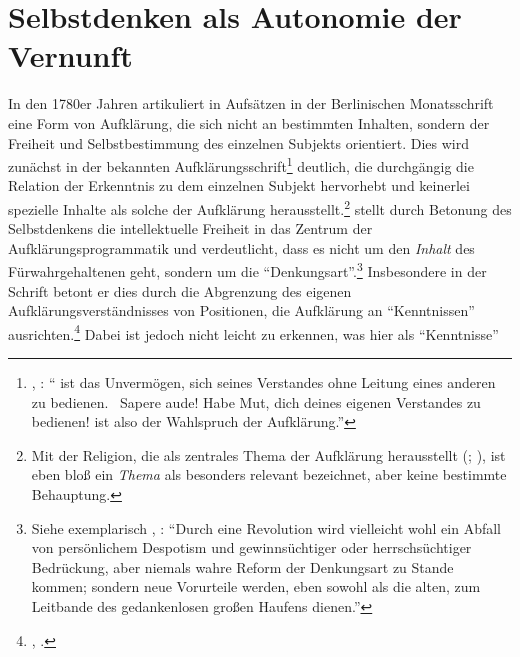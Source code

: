 \section{Selbstdenken als Autonomie der
Vernunft}\label{subsection:SelbstdenkenbeiKant}
In den 1780er Jahren artikuliert  in Aufsätzen in der
Berlinischen Monatsschrift eine Form von Aufklärung, die sich nicht an
bestimmten Inhalten, sondern der Freiheit und Selbstbestimmung des einzelnen
Subjekts orientiert. Dies wird zunächst in der bekannten
Aufklärungsschrift\footnote{\cite[Vgl.][A~481]{Kant:BeantwortungderFrage:WasistAufklaerung?1977},
\cite[][VIII: 35.1--8]{Kant:GesammelteWerke1900ff.}:
\enquote{ ist das Unvermögen, sich seines
Verstandes ohne Leitung eines anderen zu bedienen. \punkt\ Sapere aude! Habe
Mut, dich deines eigenen Verstandes zu bedienen! ist also der Wahlspruch der
Aufklärung.}} deutlich, die durchgängig die Relation der Erkenntnis zu
dem einzelnen Subjekt hervorhebt und keinerlei spezielle Inhalte als solche der
Aufklärung herausstellt.\footnote{Mit der Religion, die 
als zentrales Thema der Aufklärung herausstellt \mkbibparens{\cite[vgl.][A
492]{Kant:BeantwortungderFrage:WasistAufklaerung?1977}; \cite[][VIII:
41.10--12]{Kant:GesammelteWerke1900ff.}}, ist eben bloß ein
\emph{Thema} als besonders relevant bezeichnet, aber keine bestimmte Behauptung.}
 stellt durch Betonung des Selbstdenkens die intellektuelle
Freiheit in das Zentrum der Aufklärungsprogrammatik und verdeutlicht, dass es nicht um
den \emph{Inhalt} des Fürwahrgehaltenen geht, sondern um die
\enquote{Denkungsart}.\footnote{Siehe exemplarisch \cite[][A
484]{Kant:BeantwortungderFrage:WasistAufklaerung?1977},
\cite[][VIII: 36.28--33]{Kant:GesammelteWerke1900ff.}:
\enquote{Durch eine Revolution wird vielleicht wohl ein Abfall von
persönlichem Despotism und gewinnsüchtiger oder herrschsüchtiger Bedrückung,
aber niemals wahre Reform der Denkungsart zu Stande kommen; sondern neue
Vorurteile werden, eben sowohl als die alten, zum Leitbande des gedankenlosen
großen Haufens dienen.}} Insbesondere in der Schrift  betont er dies durch die Abgrenzung des eigenen
Aufklärungsverständnisses von Positionen, die Aufklärung an
\enquote{Kenntnissen}
ausrichten.\footnote{\cite[Vgl.][A~329]{Kant:Washeisst:SichimDenkenorientieren?1977},
\cite[][VIII: 146.31--32]{Kant:GesammelteWerke1900ff.}.} Dabei ist jedoch nicht
leicht zu erkennen, was  hier als \enquote{Kenntnisse}
